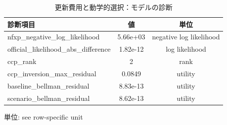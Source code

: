 \begingroup
\begin{table}[htbp]
\centering
\caption{更新費用と動学的選択：モデルの診断}
\label{tab:specialist-ddc-r01-displays-model_fit}
\begin{tabular}{lcc}
\toprule
診断項目 & 値 & 単位 \\
\midrule
nfxp\_negative\_log\_likelihood & 5.66e+03 & negative log likelihood \\
official\_likelihood\_abs\_difference & 1.82e-12 & log likelihood \\
ccp\_rank & 2 & rank \\
ccp\_inversion\_max\_residual & 0.0849 & utility \\
baseline\_bellman\_residual & 8.83e-13 & utility \\
scenario\_bellman\_residual & 8.62e-13 & utility \\
\bottomrule
\end{tabular}
\par\medskip\begin{minipage}{\linewidth}\footnotesize
単位: see row-specific unit
\end{minipage}
\end{table}
\endgroup
